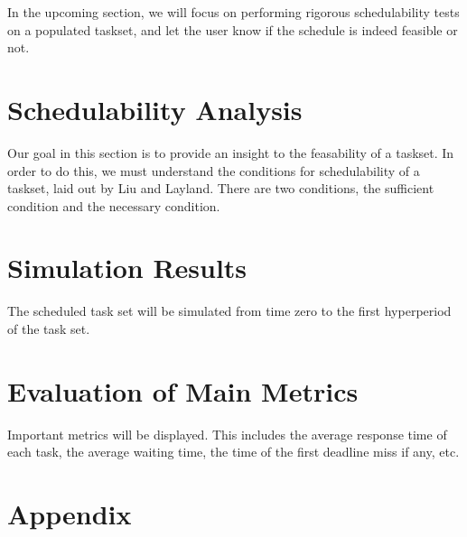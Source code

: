 In the upcoming section, we will focus on performing rigorous schedulability tests on a populated taskset, and let the user know if the schedule is indeed feasible or not.

\section{Schedulability Analysis}\label{sec:sched-analysis}

Our goal in this section is to provide an insight to the feasability of a taskset. In order to do this, we must understand the conditions for schedulability of a taskset, laid out by Liu and Layland\cite{liu-layland}. There are two conditions, the sufficient condition and the necessary condition.

\section{Simulation Results}\label{sec:sim-results}
The scheduled task set will be simulated from time zero to the first hyperperiod of the task set.
\section{Evaluation of Main Metrics}\label{sec:main-metrics}
Important metrics will be displayed. This includes the average response time of each task, the average waiting time, the time of the first deadline miss if any, etc.




\section*{Appendix}


